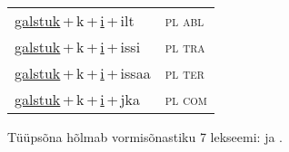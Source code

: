 \begin{minipage}{\textwidth}
\begin{sideways}
\begin{tabular}{l l}
\underline{galstuk}\,+\,k\,+\,\underline{i}\,+\,ilt & \textsc{ pl abl } \\
\underline{galstuk}\,+\,k\,+\,\underline{i}\,+\,issi & \textsc{ pl tra } \\
\underline{galstuk}\,+\,k\,+\,\underline{i}\,+\,issaa & \textsc{ pl ter } \\
\underline{galstuk}\,+\,k\,+\,\underline{i}\,+\,jka & \textsc{ pl com } \\
\end{tabular}
\end{sideways}
\label{tab:tüüpsõnamall-galstukki}

\end{minipage}

 
\vspace{1em}
\noindent Tüüpsõna hõlmab vormisõnastiku 7 lekseemi:  ja .
